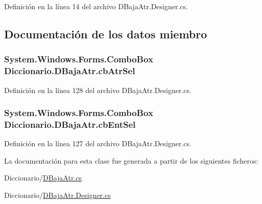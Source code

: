 Definición en la línea 14 del archivo D\-Baja\-Atr.\-Designer.\-cs.



\subsection{Documentación de los datos miembro}
\hypertarget{class_diccionario_1_1_d_baja_atr_a4043ff7bb4375a6c637cab06e1b8074e}{
\subsubsection[{cb\-Atr\-Sel}]{\setlength{\rightskip}{0pt plus 5cm}System.\-Windows.\-Forms.\-Combo\-Box Diccionario.\-D\-Baja\-Atr.\-cb\-Atr\-Sel}}\label{class_diccionario_1_1_d_baja_atr_a4043ff7bb4375a6c637cab06e1b8074e}


Definición en la línea 128 del archivo D\-Baja\-Atr.\-Designer.\-cs.

\hypertarget{class_diccionario_1_1_d_baja_atr_a448d04549fdde2794125791a291d202d}{
\subsubsection[{cb\-Ent\-Sel}]{\setlength{\rightskip}{0pt plus 5cm}System.\-Windows.\-Forms.\-Combo\-Box Diccionario.\-D\-Baja\-Atr.\-cb\-Ent\-Sel}}\label{class_diccionario_1_1_d_baja_atr_a448d04549fdde2794125791a291d202d}


Definición en la línea 127 del archivo D\-Baja\-Atr.\-Designer.\-cs.



La documentación para esta clase fue generada a partir de los siguientes ficheros\-:\begin{DoxyCompactItemize}
\item 
Diccionario/\hyperlink{_d_baja_atr_8cs}{D\-Baja\-Atr.\-cs}\item 
Diccionario/\hyperlink{_d_baja_atr_8_designer_8cs}{D\-Baja\-Atr.\-Designer.\-cs}\end{DoxyCompactItemize}
